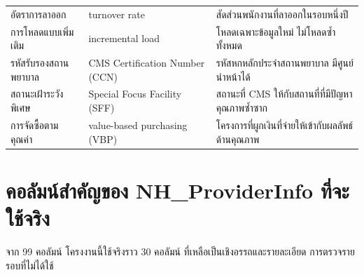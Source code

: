 \documentclass[11pt,a4paper]{article}
\begin{document}
\begin{longtable}{L{3.9cm}L{4.2cm}L{7.2cm}}
อัตราการลาออก & turnover rate & สัดส่วนพนักงานที่ลาออกในรอบหนึ่งปี \\
การโหลดแบบเพิ่มเติม & incremental load & โหลดเฉพาะข้อมูลใหม่ ไม่โหลดซ้ำทั้งหมด \\
รหัสรับรองสถานพยาบาล & CMS Certification Number (CCN) & รหัสหกหลักประจำสถานพยาบาล มีศูนย์นำหน้าได้ \\
สถานะเฝ้าระวังพิเศษ & Special Focus Facility (SFF) & สถานะที่ CMS ให้กับสถานที่ที่มีปัญหาคุณภาพซ้ำซาก \\
การจัดซื้อตามคุณค่า & value-based purchasing (VBP) & โครงการที่ผูกเงินที่จ่ายให้เข้ากับผลลัพธ์ด้านคุณภาพ \\
\end{longtable}

\section{คอลัมน์สำคัญของ NH\_ProviderInfo ที่จะใช้จริง}

จาก 99 คอลัมน์ โครงงานนี้ใช้จริงราว 30 คอลัมน์ ที่เหลือเป็นเชิงอรรถและรายละเอียด
การตรวจรายรอบที่ไม่ได้ใช้
\end{document}
